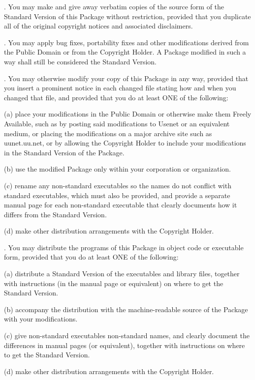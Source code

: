 \documentclass[10pt,letterpaper,titlepage]{article}
\newenvironment{lquote}{\begin{list}{}{}\item[]}{\end{list}}
\begin{document}
. You may make and give away verbatim copies of the source form of the Standard Version of this Package without restriction, provided that you duplicate all of the original copyright notices and associated disclaimers.
\vspace{8pt}

. You may apply bug fixes, portability fixes and other modifications derived from the Public Domain or from the Copyright Holder.  A Package modified in such a way shall still be considered the Standard Version.
\vspace{8pt}

. You may otherwise modify your copy of this Package in any way, provided that you insert a prominent notice in each changed file stating how and when you changed that file, and provided that you do at least ONE of the following:

\begin{lquote}
(a) place your modifications in the Public Domain or otherwise make them Freely Available, such as by posting said modifications to Usenet or an equivalent medium, or placing the modifications on a major archive site such as uunet.uu.net, or by allowing the Copyright Holder to include your modifications in the Standard Version of the Package.

(b) use the modified Package only within your corporation or organization.

(c) rename any non-standard executables so the names do not conflict with standard executables, which must also be provided, and provide a separate manual page for each non-standard executable that clearly documents how it differs from the Standard Version.

(d) make other distribution arrangements with the Copyright Holder.
\end{lquote}

. You may distribute the programs of this Package in object code or executable form, provided that you do at least ONE of the following:

\begin{lquote}
(a) distribute a Standard Version of the executables and library files, together with instructions (in the manual page or equivalent) on where to get the Standard Version.

(b) accompany the distribution with the machine-readable source of the Package with your modifications.

(c) give non-standard executables non-standard names, and clearly document the differences in manual pages (or equivalent), together with instructions on where to get the Standard Version.

(d) make other distribution arrangements with the Copyright Holder.
\end{lquote}
\end{document}
